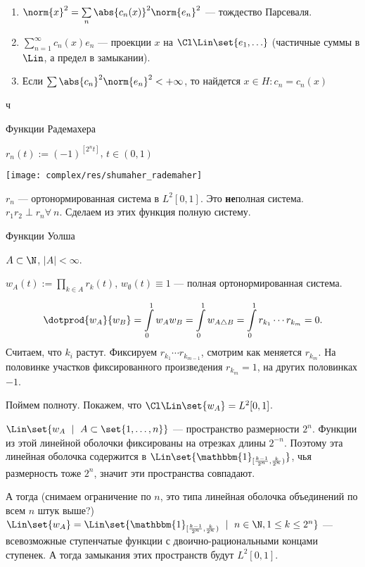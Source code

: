 \begin{observation}
    \begin{enumerate}
        \item $\norm{x}^2 = \sum\limits_n \abs{c_n(x)}^2 \norm{e_n}^2$ --- тождество Парсеваля.
        \item $\sum\limits_{n=1}^\infty c_n(x) e_n$ --- проекции $x$ на $\Cl \Lin \set{e_1, \ldots}$ (частичные суммы в $\Lin$, а предел в замыкании).
        \item Если $\sum \abs{c_n}^2 \norm{e_n}^2 < +\infty$, то найдется $x \in H: c_n = c_n(x)$
    \end{enumerate}
\end{observation}

ч

\begin{example}{Функции Радемахера}

    $r_n(t) := (-1)^{[2^nt]}$, $t \in (0, 1)$

    \texttt{[image: complex/res/shumaher\_rademaher]}

    $r_n$ --- ортонормированная система в $L^2[0,1]$.
    Это \textbf{не}полная система. $r_1 r_2 \perp r_n \forall\ n$.
    Сделаем из этих функция полную систему.
\end{example}

\begin{example}{Функции Уолша}

    $A \subset \N$, $|A| < \infty$.

    $w_A(t) := \prod_{k \in A} r_k(t)$, $w_{\emptyset}(t) \equiv 1$ --- полная ортонормированная система.

    \[\dotprod{w_A}{w_B} = \int\limits_0^1 w_A w_B = \int\limits_0^1 w_{A \triangle B} = \int\limits_0^1 r_{k_1} \cdots r_{k_m} = 0
        .\]
    Считаем, что $k_i$ растут. Фиксируем $r_{k_1} \cdots r_{k_{m-1}}$, смотрим как меняется $r_{k_m}$. На половинке участков фиксированного произведения $r_{k_m} = 1$, на других половинках $-1$.

    Поймем полноту. Покажем, что $\Cl \Lin \set{w_A} = L^2[0,1]$.

    $\Lin \set{w_A\ \mid\ A \subset \set{1, \ldots, n}}$ --- пространство размерности $2^n$.
    Функции из этой линейной оболочки фиксированы на отрезках длины $2^{-n}$.
    Поэтому эта линейная оболочка содержится в $\Lin \set{\mathbbm{1}_{[\frac{k-1}{2^n}, \frac{k}{2^n})}}$, чья размерность тоже $2^n$, значит эти пространства совпадают.

    А тогда (снимаем ограничение по $n$, это типа линейная оболочка объединений по всем $n$ штук выше?) $\Lin \set{w_A} = \Lin \set{\mathbbm{1}_{[\frac{k-1}{2^n}, \frac{k}{2^n})}\ \mid\ n \in \N, 1 \leq k \leq 2^n}$ --- всевозможные ступенчатые функции с двоично-рациональными концами ступенек. А тогда замыкания этих пространств будут $L^2[0,1]$.
\end{example}

